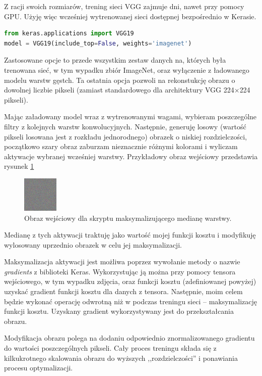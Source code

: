 Z racji swoich rozmiarów, trening sieci VGG zajmuje dni, nawet przy pomocy GPU. Użyję więc wcześniej wytrenowanej sieci dostępnej bezpośrednio w Kerasie.

\begin{lstlisting}[language=Python, caption={Wczytywanie wag VGG-19 w Keras.}, label={lst:vggkeras}, captionpos=b]
from keras.applications import VGG19
model = VGG19(include_top=False, weights='imagenet')
\end{lstlisting}

Zastosowane opcje to przede wszystkim zestaw danych na, których była trenowana sieć, w tym wypadku zbiór ImageNet\cite{imagenet}, oraz wyłączenie z ładowanego modelu warstw gęstch. Ta ostatnia opcja pozwoli na rekonstukcję obrazu o dowolnej liczbie pikseli (zamiast standardowego dla architektury VGG 224\(\times\)224 pikseli).

Mając załadowany model wraz z wytrenowanymi wagami, wybieram poszczególne filtry z kolejnych warstw konwolucyjnych. Następnie, generuję losowy (wartość pikseli losowana jest z rozkładu jednorodnego) obrazek o niskiej rozdzielczości, początkowo szary obraz zaburzam nieznacznie różnymi kolorami i wyliczam aktywacje wybranej wcześniej warstwy.
Przykładowy obraz wejściowy przedstawia rysunek \ref{fig:obrazwe}

\begin{figure}[ht]
\centerline{\includegraphics[scale=1]{resources/cnn/obrazwe.png}}
\caption{Obraz wejściowy dla skryptu maksymalizującego medianę warstwy.}
\label{fig:obrazwe}
\end{figure}

Medianę z tych aktywacji traktuję jako wartość mojej funkcji kosztu i modyfikuję wylosowany uprzednio obrazek w celu jej maksymalizacji.

Maksymalizacja aktywacji jest możliwa poprzez wywołanie metody o nazwie \textit{gradients} z biblioteki Keras. Wykorzystując ją można przy pomocy tensora wejściowego, w tym wypadku zdjęcia, oraz funkcji kosztu (zdefiniowanej powyżej) uzyskać gradient funkcji kosztu dla danych z tensora.
Następnie, moim celem będzie wykonać operację odwrotną niż w podczas treningu sieci -- maksymalizację funkcji kosztu. Uzyskany gradient wykorzystywany jest do przekształcania obrazu.

Modyfikacja obrazu polega na dodaniu odpowiednio znormalizowanego gradientu do wartości poszczególnych pikseli. Cały proces treningu składa się z kilkukrotnego skalowania obrazu do wyższych ,,rozdzielczości'' i ponawiania procesu optymalizacji. 

